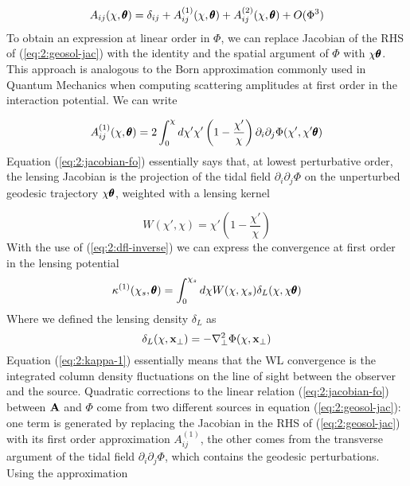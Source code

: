 \begin{equation}
\label{eq:2:jacobian-pert}
A_{ij}(\chi,\pmb{\theta}) = \delta_{ij} + A_{ij}^{(1)}(\chi,\pmb{\theta}) + A_{ij}^{(2)}(\chi,\pmb{\theta}) + O(\Phi^3)
\end{equation}
%
To obtain an expression at linear order in $\Phi$, we can replace Jacobian of the RHS of (\ref{eq:2:geosol-jac}) with the identity and the spatial argument of $\Phi$ with $\chi\pmb{\theta}$. This approach is analogous to the Born approximation commonly used in Quantum Mechanics when computing scattering amplitudes at first order in the interaction potential. We can write

\begin{equation}
\label{eq:2:jacobian-fo}
A_{ij}^{(1)}(\chi,\pmb{\theta}) = 2\int_0^\chi d\chi'\chi'\left(1-\frac{\chi'}{\chi}\right)\partial_i\partial_j\Phi(\chi',\chi'\pmb{\theta})
\end{equation}
%
Equation (\ref{eq:2:jacobian-fo}) essentially says that, at lowest perturbative order, the lensing Jacobian is the projection of the tidal field $\partial_i\partial_j\Phi$ on the unperturbed geodesic trajectory $\chi\pmb{\theta}$, weighted with a lensing kernel

\begin{equation}
W(\chi',\chi) = \chi'\left(1-\frac{\chi'}{\chi}\right) 
\end{equation}
%
With the use of (\ref{eq:2:dfl-inverse}) we can express the convergence at first order in the lensing potential
\begin{equation}
\label{eq:2:kappa-1}
\kappa^{(1)}(\chi_s,\pmb{\theta}) = \int_0^{\chi_s}d\chi W(\chi,\chi_s)\delta_L(\chi,\chi\pmb{\theta})
\end{equation}
%
Where we defined the lensing density $\delta_L$ as 
\begin{equation}
\label{eq:2:deltalens}
\delta_L(\chi,\mathbf{x}_\perp) = -\nabla^2_\perp \Phi(\chi,\mathbf{x}_\perp)
\end{equation}
%
Equation (\ref{eq:2:kappa-1}) essentially means that the WL convergence is the integrated column density fluctuations on the line of sight between the observer and the source. Quadratic corrections to the linear relation (\ref{eq:2:jacobian-fo}) between $\mathbf{A}$ and $\Phi$ come from two different sources in equation (\ref{eq:2:geosol-jac}): one term is generated by replacing the Jacobian in the RHS of (\ref{eq:2:geosol-jac}) with its first order approximation $A_{ij}^{(1)}$, the other comes from the transverse argument of the tidal field $\partial_i\partial_j\Phi$, which contains the geodesic perturbations. Using the approximation

